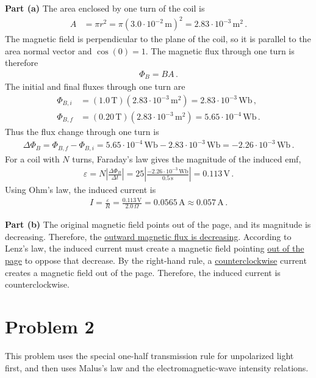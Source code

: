 \documentclass[11pt]{article}
\begin{document}
\noindent\textbf{Part (a)} The area enclosed by one turn of the coil is
\begin{align*}
A&=\pi r^2=\pi(3.0\cdot 10^{-2}\,\text{m})^2=2.83\cdot 10^{-3}\,\text{m}^2\,.
\end{align*}
The magnetic field is perpendicular to the plane of the coil, so it is parallel to the area normal vector and $\cos(0)=1$. The magnetic flux through one turn is therefore
\begin{align*}
\Phi_B=BA\,.
\end{align*}
The initial and final fluxes through one turn are
\begin{align*}
\Phi_{B,i}
&=(1.0\,\text{T})(2.83\cdot 10^{-3}\,\text{m}^2)
=2.83\cdot 10^{-3}\,\text{Wb}\,,\\
\Phi_{B,f}
&=(0.20\,\text{T})(2.83\cdot 10^{-3}\,\text{m}^2)
=5.65\cdot 10^{-4}\,\text{Wb}\,.
\end{align*}
Thus the flux change through one turn is
\begin{align*}
\Delta\Phi_B=\Phi_{B,f}-\Phi_{B,i}=5.65\cdot 10^{-4}\,\text{Wb}-2.83\cdot 10^{-3}\,\text{Wb}=-2.26\cdot 10^{-3}\,\text{Wb}\,.
\end{align*}
For a coil with $N$ turns, Faraday's law gives the magnitude of the induced emf,
\begin{align*}
\varepsilon=N\left|\frac{\Delta\Phi_B}{\Delta t}\right|=25\left|\frac{-2.26\cdot 10^{-3}\,\text{Wb}}{0.5\,\text{s}}\right|=0.113\,\text{V}\,.
\end{align*}
Using Ohm's law, the induced current is
\begin{align*}
I=\frac{\varepsilon}{R}
=\frac{0.113\,\text{V}}{2.0\,\Omega}
=0.0565\,\text{A}\approx 0.057\,\text{A}\,.
\end{align*}

\noindent\textbf{Part (b)} The original magnetic field points out of the page, and its magnitude is decreasing. Therefore, the \underline{outward magnetic flux is decreasing}. According to Lenz's law, the induced current must create a magnetic field pointing \underline{out of the page} to oppose that decrease. By the right-hand rule, a \underline{counterclockwise} current creates a magnetic field out of the page. Therefore, the induced current is counterclockwise.\\


\section*{Problem 2}
This problem uses the special one-half transmission rule for unpolarized light first, and then uses Malus's law and the electromagnetic-wave intensity relations.\\
\end{document}
